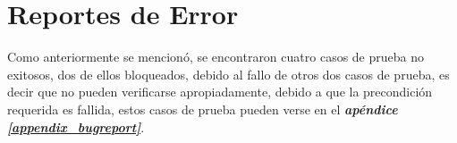 \section{Reportes de Error}
Como anteriormente se mencionó, se encontraron cuatro casos de prueba no
exitosos, dos de ellos bloqueados, debido al fallo de otros dos casos de
prueba, es decir que no pueden verificarse apropiadamente, debido a que la
precondición requerida es fallida, estos casos de prueba pueden verse en el
\emph{\textbf{apéndice \ref{appendix_bugreport}}}.

